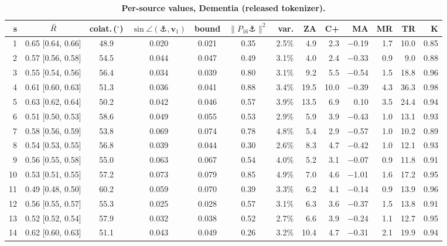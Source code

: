 \begin{table}[p]
\renewcommand{\baselinestretch}{1}
\caption{{\bf Per-source values, Dementia (released tokenizer).}}
\label{tab:supp-dementia}
\centering\scriptsize
\setlength{\tabcolsep}{2.5pt}
\begin{tabular}{rcccccrrrrrrr}
\toprule
\textbf{s} & $\bar{R}$ & \textbf{colat.}\,($^\circ$) & $\sin\angle(\anchor,\bm{v}_1)$ & \textbf{bound} & $\|P_{16}\anchor\|^2$ & \textbf{var.} & \textbf{ZA} & \textbf{C+} & \textbf{MA} & \textbf{MR} & \textbf{TR} & \textbf{K} \\
\midrule
1 & 0.65 [0.64, 0.66] & 48.9 & 0.020 & 0.021 & 0.35 & 2.5\% & 4.9 & 2.3 & $-$0.19 & 1.7 & 10.0 & 0.85 \\
2 & 0.57 [0.56, 0.58] & 54.5 & 0.044 & 0.047 & 0.49 & 3.1\% & 4.0 & 2.4 & $-$0.33 & 0.9 & 9.0 & 0.88 \\
3 & 0.55 [0.54, 0.56] & 56.4 & 0.034 & 0.039 & 0.80 & 3.1\% & 9.2 & 5.5 & $-$0.54 & 1.5 & 18.8 & 0.96 \\
4 & 0.61 [0.60, 0.63] & 51.3 & 0.036 & 0.041 & 0.88 & 3.4\% & 19.5 & 10.0 & $-$0.39 & 4.3 & 36.3 & 0.98 \\
5 & 0.63 [0.62, 0.64] & 50.2 & 0.042 & 0.046 & 0.57 & 3.9\% & 13.5 & 6.9 & 0.10 & 3.5 & 24.4 & 0.94 \\
6 & 0.51 [0.50, 0.53] & 58.6 & 0.049 & 0.055 & 0.53 & 2.9\% & 5.9 & 3.9 & $-$0.43 & 1.0 & 13.1 & 0.93 \\
7 & 0.58 [0.56, 0.59] & 53.8 & 0.069 & 0.074 & 0.78 & 4.8\% & 5.4 & 2.9 & $-$0.57 & 1.0 & 10.2 & 0.89 \\
8 & 0.54 [0.53, 0.55] & 56.8 & 0.039 & 0.044 & 0.30 & 2.6\% & 8.3 & 4.7 & $-$0.42 & 1.0 & 12.1 & 0.93 \\
9 & 0.56 [0.55, 0.58] & 55.0 & 0.063 & 0.067 & 0.54 & 4.0\% & 5.2 & 3.1 & $-$0.07 & 0.9 & 11.8 & 0.91 \\
10 & 0.53 [0.51, 0.55] & 57.2 & 0.073 & 0.079 & 0.85 & 4.9\% & 7.0 & 4.6 & $-$1.01 & 1.6 & 17.2 & 0.95 \\
11 & 0.49 [0.48, 0.50] & 60.2 & 0.059 & 0.070 & 0.39 & 3.3\% & 6.2 & 4.1 & $-$0.14 & 0.9 & 13.9 & 0.96 \\
12 & 0.56 [0.55, 0.57] & 55.3 & 0.025 & 0.028 & 0.57 & 3.1\% & 6.3 & 3.6 & $-$0.37 & 1.5 & 13.8 & 0.91 \\
13 & 0.52 [0.52, 0.54] & 57.9 & 0.032 & 0.038 & 0.52 & 2.7\% & 6.6 & 3.9 & $-$0.24 & 1.1 & 12.7 & 0.95 \\
14 & 0.62 [0.60, 0.63] & 51.1 & 0.043 & 0.049 & 0.26 & 3.2\% & 10.4 & 4.7 & $-$0.31 & 2.1 & 19.9 & 0.94 \\

\end{tabular}
\end{table}
